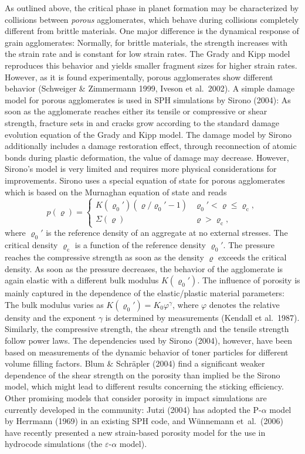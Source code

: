 As outlined above, the critical phase in planet formation may be
characterized by collisions between {\it porous} agglomerates, which behave
during collisions completely different from brittle materials.  One major
difference is the dynamical response of grain agglomerates: Normally, for
brittle materials, the strength increases with the strain rate and is
constant for low strain rates. The Grady and Kipp model reproduces this
behavior and yields smaller fragment sizes for higher strain rates. However,
as it is found experimentally, porous agglomerates show different behavior
(Schweiger \& Zimmermann 1999, Iveson et al.~2002). A simple damage model
for porous agglomerates is used in SPH simulations by Sirono (2004): As soon
as the agglomerate reaches either its tensile or compressive or shear
strength, fracture sets in and cracks grow according to the standard damage
evolution equation of the Grady and Kipp model.  The damage model by Sirono
additionally includes a damage restoration effect, through reconnection of
atomic bonds during plastic deformation, the value of damage may
decrease. However, Sirono's model is very limited and requires more physical
considerations for improvements.  Sirono uses a special equation of state
for porous agglomerates which is based on the Murnaghan equation of state
and reads
%
\begin{equation} p(\varrho) = \left\{ \begin{array}{ll}
K(\varrho_0')(\varrho/\varrho_0'-1) & \varrho_0' < \varrho \le
\varrho_\mathrm{c}, \\ \Sigma(\varrho) & \varrho > \varrho_\mathrm{c},
\end{array} \right.  \end{equation}
%
where $\varrho_0'$ is the reference density of an aggregate at no
external stresses. The critical density $\varrho_\mathrm{c}$ is a
function of the reference density $\varrho_0'$. The pressure reaches the
compressive strength as soon as the density $\varrho$ exceeds the
critical density. As soon as the pressure decreases, the behavior of
the agglomerate is again elastic with a different bulk modulus
$K(\varrho_0')$. The influence of porosity is mainly captured in the
dependence of the elastic/plastic material parameters: The bulk modulus
varies as $K(\varrho_0') = K_0 \varphi^\gamma$, where $\varphi$ denotes
the relative density and the exponent $\gamma$ is determined by
measurements (Kendall et al.~1987). Similarly, the compressive
strength, the shear strength and the tensile strength follow power laws.
The dependencies used by Sirono (2004), however, have been based on
measurements of the dynamic behavior of toner particles for different
volume filling factors. Blum \& Schr\"apler (2004) find a significant
weaker dependence of the shear strength on the porosity than implied be the
Sirono model, which might lead to different results concerning the sticking
efficiency. Other promising models that consider porosity in impact
simulations are currently developed in the community: Jutzi (2004) has
adopted the P-$\alpha$ model by Herrmann (1969) in an existing SPH code,
and W{\"u}nnemann et~al.\ (2006) have recently presented a new
strain-based porosity model for the use in hydrocode simulations (the
$\varepsilon$-$\alpha$ model). 

